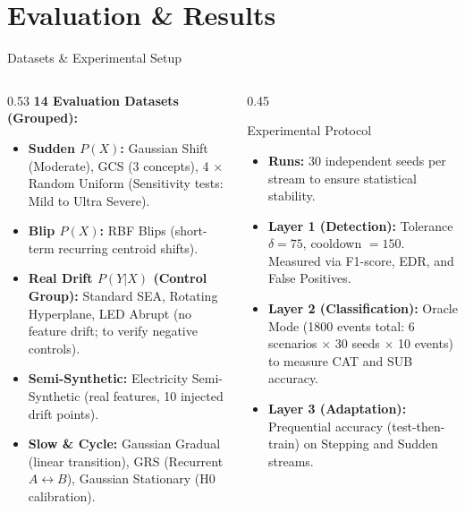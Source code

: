 \documentclass[aspectratio=169,10pt]{beamer}
\begin{document}
\section{Evaluation \& Results}

\begin{frame}{Datasets \& Experimental Setup}
	\vfill
	\begin{columns}[c]
		\begin{column}{0.53\textwidth}
			\textbf{14 Evaluation Datasets (Grouped):}
			\begin{itemize}
				\scriptsize
				\item \textbf{Sudden $P(X)$:} Gaussian Shift (Moderate), GCS (3 concepts), 4 $\times$ Random Uniform (Sensitivity tests: Mild to Ultra Severe).
				\item \textbf{Blip $P(X)$:} RBF Blips (short-term recurring centroid shifts).
				\item \textbf{Real Drift $P(Y|X)$ (Control Group):} Standard SEA, Rotating Hyperplane, LED Abrupt (no feature drift; to verify negative controls).
				\item \textbf{Semi-Synthetic:} Electricity Semi-Synthetic (real features, 10 injected drift points).
				\item \textbf{Slow \& Cycle:} Gaussian Gradual (linear transition), GRS (Recurrent $A \leftrightarrow B$), Gaussian Stationary (H0 calibration).
			\end{itemize}
		\end{column}
		\begin{column}{0.45\textwidth}
			\begin{block}{\small Experimental Protocol}
				\scriptsize
				\begin{itemize}
					\item \textbf{Runs:} 30 independent seeds per stream to ensure statistical stability.
					\item \textbf{Layer 1 (Detection):} Tolerance $\delta = 75$, cooldown $= 150$. Measured via F1-score, EDR, and False Positives.
					\item \textbf{Layer 2 (Classification):} Oracle Mode (1800 events total: 6 scenarios $\times$ 30 seeds $\times$ 10 events) to measure CAT and SUB accuracy.
					\item \textbf{Layer 3 (Adaptation):} Prequential accuracy (test-then-train) on Stepping and Sudden streams.
				\end{itemize}
			\end{block}
		\end{column}
	\end{columns}
	\vfill
\end{frame}
\end{document}
